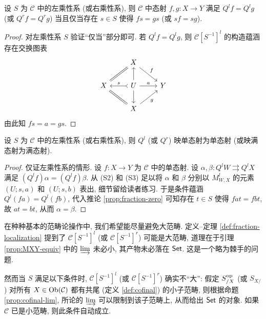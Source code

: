 \begin{corollary}\label{prop:fraction-zero}
	设 $S$ 为 $\mathcal{C}$ 中的左乘性系 (或右乘性系), 则 $\mathcal{C}$ 中态射 $f, g: X \to Y$ 满足 $Q^l f = Q^l g$ (或 $Q^r f = Q^r g$) 当且仅当存在 $s \in S$ 使得 $fs = gs$ (或 $sf = sg$).
\end{corollary}
\begin{proof}
	对左乘性系 $S$ 验证``仅当''部分即可. 若 $Q^l f = Q^l g$, 则 $\mathcal{C}[S^{-1}]^l$ 的构造蕴涵存在交换图表
	\[\begin{tikzcd}
		& X \arrow[equal, ld] \arrow[rd, "f"] & \\
		X & U \arrow[rightarrowtail, l, "s"'] \arrow[r, "a"] \arrow[d] \arrow[u] & Y \\
		& X \arrow[equal, lu] \arrow[ru, "g"'] &
	\end{tikzcd}\]
	由此知 $fs = a = gs$.
\end{proof}

\begin{corollary}\label{prop:fraction-mono-epi}
	设 $S$ 为 $\mathcal{C}$ 中的左乘性系 (或右乘性系), 则 $Q^l$ (或 $Q^r$) 映单态射为单态射 (或映满态射为满态射).
\end{corollary}
\begin{proof}
	仅证左乘性系的情形. 设 $f: X \to Y$ 为 $\mathcal{C}$ 中的单态射. 设 $\alpha, \beta: Q^l W \rightrightarrows Q^l X$ 满足 $(Q^l f)\alpha = (Q^l f)\beta$. 从 (S2) 和 (S3) 足以将 $\alpha$ 和 $\beta$ 分别以 $M^l_{W, X}$ 的元素 $(U; s, a)$ 和 $(U; s, b)$ 表出, 细节留给读者练习. 于是条件蕴涵 $Q^l(fa) = Q^l(fb)$, 代入推论 \ref{prop:fraction-zero} 可知存在 $t \in S$ 使得 $fat = fbt$, 故 $at = bt$, 从而 $\alpha = \beta$. 
\end{proof}

\begin{remark}\label{rem:localization-size}
	在种种基本的范畴论操作中, 我们希望能尽量避免大范畴. 定义--定理 \ref{def:fraction-localization} 提到了 $\mathcal{C}[S^{-1}]^l$ (或 $\mathcal{C}[S^{-1}]^r$) 可能是大范畴, 道理在于引理 \ref{prop:MXY-equiv} 中的 $\varinjlim$ 未必小, 其产物未必落在 $\mathsf{Set}$. 这是一个略为棘手的问题.
	
	然而当 $S$ 满足以下条件时, $\mathcal{C}[S^{-1}]^l$ (或 $\mathcal{C}[S^{-1}]^r$) 确实不``大'': 假定 $S_{/X}^{\operatorname{op}}$ (或 $S_{X/}$) 对所有 $X \in \operatorname{Ob}(\mathcal{C})$ 都有共尾 (定义 \ref{def:cofinal}) 的小子范畴, 则根据命题 \ref{prop:cofinal-lim}, 所论的 $\varinjlim$ 可以限制到该子范畴上, 从而给出 $\mathsf{Set}$ 的对象. 如果 $\mathcal{C}$ 已是小范畴, 则此条件自动成立.
\end{remark}

